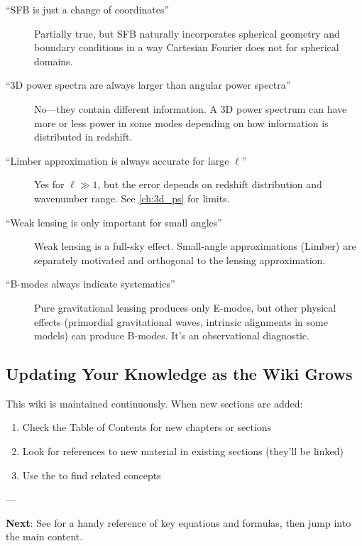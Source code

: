\begin{description}
    \item[``SFB is just a change of coordinates''] Partially true, but SFB naturally incorporates spherical geometry and boundary conditions in a way Cartesian Fourier does not for spherical domains.
    
    \item[``3D power spectra are always larger than angular power spectra''] No—they contain different information. A 3D power spectrum can have more or less power in some modes depending on how information is distributed in redshift.
    
    \item[``Limber approximation is always accurate for large $\ell$''] Yes for $\ell \gg 1$, but the error depends on redshift distribution and wavenumber range. See \cref{ch:3d_ps} for limits.
    
    \item[``Weak lensing is only important for small angles''] Weak lensing is a full-sky effect. Small-angle approximations (Limber) are separately motivated and orthogonal to the lensing approximation.
    
    \item[``B-modes always indicate systematics''] Pure gravitational lensing produces only E-modes, but other physical effects (primordial gravitational waves, intrinsic alignments in some models) can produce B-modes. It's an observational diagnostic.
\end{description}

\subsection{Updating Your Knowledge as the Wiki Grows}\label{subsec:guide_updates}

This wiki is maintained continuously. When new sections are added:

\begin{enumerate}
    \item Check the Table of Contents for new chapters or sections
    \item Look for references to new material in existing sections (they'll be linked)
    \item Use the  to find related concepts
\end{enumerate}

---

\noindent
\textbf{Next}: See  for a handy reference of key equations and formulas, then jump into the main content.
